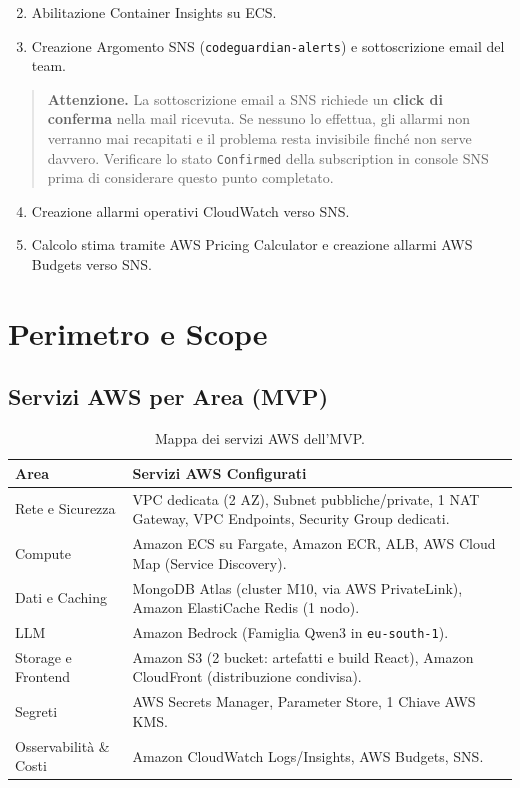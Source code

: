 \documentclass[11pt,a4paper]{article}
\begin{document}
\begin{enumerate}
    \setcounter{enumi}{1}
    \item Abilitazione Container Insights su ECS.
    \item Creazione Argomento SNS (\texttt{codeguardian-alerts}) e sottoscrizione email del team.
\end{enumerate}

\begin{quote}
\textbf{Attenzione.} La sottoscrizione email a SNS richiede un \textbf{click di conferma} nella mail ricevuta. Se nessuno lo effettua, gli allarmi non verranno mai recapitati e il problema resta invisibile finché non serve davvero. Verificare lo stato \texttt{Confirmed} della subscription in console SNS prima di considerare questo punto completato.
\end{quote}

\begin{enumerate}
    \setcounter{enumi}{3}
    \item Creazione allarmi operativi CloudWatch verso SNS.
    \item Calcolo stima tramite AWS Pricing Calculator e creazione allarmi AWS Budgets verso SNS.
\end{enumerate}

\section{Perimetro e Scope}
\label{sec:aws-perimetro}

\subsection{Servizi AWS per Area (MVP)}

\begin{table}[H]
\centering
\caption{Mappa dei servizi AWS dell'MVP.}
\label{tab:aws-servizi}
\vspace{2mm}
\renewcommand{\arraystretch}{1.2}
\begin{tabularx}{\textwidth}{|l|X|}
\hline
\textbf{Area} & \textbf{Servizi AWS Configurati} \\ \hline
Rete e Sicurezza & VPC dedicata (2 AZ), Subnet pubbliche/private, 1 NAT Gateway, VPC Endpoints, Security Group dedicati. \\ \hline
Compute & Amazon ECS su Fargate, Amazon ECR, ALB, AWS Cloud Map (Service Discovery). \\ \hline
Dati e Caching & MongoDB Atlas (cluster M10, via AWS PrivateLink), Amazon ElastiCache Redis (1 nodo). \\ \hline
LLM & Amazon Bedrock (Famiglia Qwen3 in \texttt{eu-south-1}). \\ \hline
Storage e Frontend & Amazon S3 (2 bucket: artefatti e build React), Amazon CloudFront (distribuzione condivisa). \\ \hline
Segreti & AWS Secrets Manager, Parameter Store, 1 Chiave AWS KMS. \\ \hline
Osservabilità \& Costi & Amazon CloudWatch Logs/Insights, AWS Budgets, SNS. \\ \hline
\end{tabularx}
\end{table}
\end{document}
